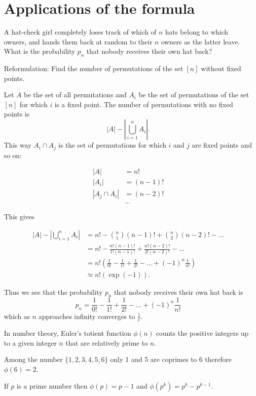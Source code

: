 \section{Applications of the formula}
\begin{question}
A hat-check girl completely loses track of which of $n$ hats belong to which owners, and
hands them back at random to their $n$ owners as the latter leave. What is the
probability $p_{n}$ that nobody receives their own hat back?

Reformulation: Find the number of permutations of the set $[n]$ without fixed points.
\end{question}
\begin{answer}
Let $A$ be the set of all permutations and $A_{i}$ be the set of permutations of the set $[n]$ for which $i$ is a fixed point. The number of permutations with no fixed points is
$$
|A|-\left|\bigcup _{i=1}^{n}A_{i}\right|.
$$
This way $A_{i}\cap A_{j}$ is the set of permutations for which $i$ and $j$ are fixed points and so on:

\begin{align*}
|A| & =n! \\
|A_{i}| & =(n-1)! \\
|A_{j}\cap A_{i}| & =(n-2)! \\
 & \dots
\end{align*}

This gives 

\begin{align*}
|A|-\left|\bigcup _{i=1}^{n}A_{i}\right| & =n!-\binom{n}{1}(n-1)!+\binom{n}{2}(n-2)!-\dots \\
 & =n!-\frac{n!(n-1)!}{1!(n-1)!}+\frac{n!(n-2)!}{2!(n-2)!}-\dots \\
 & =n!\left( \frac{1}{0!}-\frac{1}{1!}+\frac{1}{2!}-\dots+(-1)^{n} \frac{1}{n!} \right) \\
 & \simeq n!(\exp(-1)).
\end{align*}

Thus we see that the probability $p_{n}$ that nobody receives their own hat back is
$$
p_{n}=\frac{1}{0!}-\frac{1}{1!}+\frac{1}{2!}-\dots+(-1)^{n} \frac{1}{n!}
$$
which as $n$ approaches infinity converges to $\frac{1}{e}$.
\end{answer}

\begin{definition}
In number theory, Euler's totient function $\phi(n)$ counts the positive integers up to a given integer $n$ that are relatively prime to $n$.
\end{definition}
\begin{example}
Among the number $\{ 1,2,3,4,5,6 \}$ only 1 and 5 are coprimes to 6 therefore $\phi(6)=2$.
\end{example}
\begin{example}
If $p$ is a prime number then $\phi(p)=p-1$ and $\phi(p^{k})=p^{k}-p^{k-1}$. 
\end{example}

